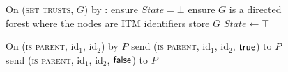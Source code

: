 \begin{figure}[H]
  \begin{systembox}{\gtrust}
    \begin{algorithmic}[1]
      \State On (\textsc{set trusts}, $G$) by \environment:
      \Indent
        \State ensure $\textit{State} = \bot$
        \State ensure $G$ is a directed forest where the nodes are ITM
        identifiers
        \State store $G$
        \State $\textit{State} \gets \top$
      \EndIndent
      \Statex

      \State On (\textsc{is parent}, $\mathrm{id}_1$, $\mathrm{id}_2$) by $P$
      \Indent
          \State send (\textsc{is parent}, $\mathrm{id}_1$, $\mathrm{id}_2$,
          $\mathsf{true}$) to $P$
        \Else
          \State send (\textsc{is parent}, $\mathrm{id}_1$, $\mathrm{id}_2$,
          $\mathsf{false}$) to $P$
        \EndIf
      \EndIndent
    \end{algorithmic}
  \end{systembox}
\end{figure}
